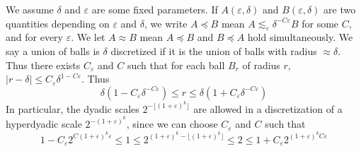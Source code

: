 We assume $\delta$ and $\varepsilon$ are some fixed parameters. If $A(\varepsilon, \delta)$ and $B(\varepsilon,\delta)$ are two quantities depending on $\varepsilon$ and $\delta$, we write $A \preccurlyeq B$ mean $A \lesssim_\varepsilon \delta^{-C \varepsilon} B$ for some $C$, and for every $\varepsilon$. We let $A \approx B$ mean $A \preccurlyeq B$ and $B \preccurlyeq A$ hold simultaneously. We say a union of balls is $\delta$ discretized if it is the union of balls with radius $\approx \delta$. Thus there exists $C_\varepsilon$ and $C$ such that for each ball $B_r$ of radius $r$, $|r - \delta| \leq C_\varepsilon \delta^{1-C \varepsilon}$. Thus
%
\[ \delta(1 - C_\varepsilon \delta^{-C \varepsilon}) \leq r \leq \delta(1 + C_\varepsilon \delta^{- C \varepsilon}) \]
%
In particular, the dyadic scales $2^{-\lfloor (1 + \varepsilon)^k \rfloor}$ are allowed in a discretization of a hyperdyadic scale $2^{-(1+\varepsilon)^k}$, since we can choose $C_\varepsilon$ and $C$ such that
%
\[ 1 - C_\varepsilon 2^{C (1 + \varepsilon)^k \varepsilon} \leq 1 \leq 2^{(1 + \varepsilon)^k -\lfloor (1 + \varepsilon)^k \rfloor} \leq 2 \leq 1 + C_\varepsilon 2^{(1 + \varepsilon)^k C \varepsilon} \]

